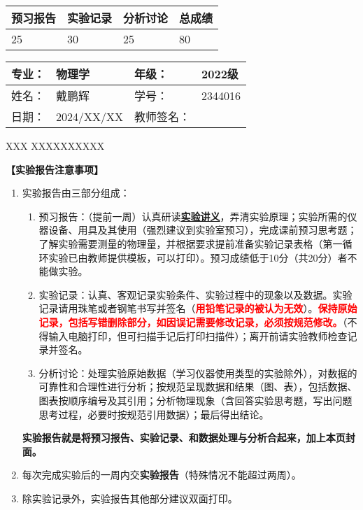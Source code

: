 \documentclass[dvipsnames, svgnames,a4paper,11pt]{article}
\begin{document}
\begin{table}
	\renewcommand\arraystretch{1.7}
	\begin{tabularx}{\textwidth}{
		|X|X|X|X
		|X|X|X|X|}
	\hline
	\multicolumn{2}{|c|}{预习报告}&\multicolumn{2}{|c|}{实验记录}&\multicolumn{2}{|c|}{分析讨论}&\multicolumn{2}{|c|}{总成绩}\\
	\hline
	\LARGE25 & & \LARGE30 & & \LARGE25 & & \LARGE80 & \\
	\hline
	\end{tabularx}
\end{table}


\begin{table}
	\renewcommand\arraystretch{1.7}
	\begin{tabularx}{\textwidth}{|X|X|X|X|}
	\hline
	专业：& 物理学 &年级：& 2022级\\
	\hline
	姓名：& 戴鹏辉  & 学号： & 2344016 \\
	\hline
	日期：& 2024/XX/XX & 教师签名：& \\
	\hline
	\end{tabularx}
\end{table}

\begin{center}
	\LARGE XXX \quad XXXXXXXXXX
\end{center}

\textbf{【实验报告注意事项】}
\begin{enumerate}
	\item 实验报告由三部分组成：
	\begin{enumerate}
		\item 预习报告：（提前一周）认真研读\underline{\textbf{实验讲义}}，弄清实验原理；实验所需的仪器设备、用具及其使用（强烈建议到实验室预习），完成课前预习思考题；了解实验需要测量的物理量，并根据要求提前准备实验记录表格（第一循环实验已由教师提供模板，可以打印）。预习成绩低于10分（共20分）者不能做实验。
	    \item 实验记录：认真、客观记录实验条件、实验过程中的现象以及数据。实验记录请用珠笔或者钢笔书写并签名（\textcolor{red}{\textbf{用铅笔记录的被认为无效}}）。\textcolor{red}{\textbf{保持原始记录，包括写错删除部分，如因误记需要修改记录，必须按规范修改。}}（不得输入电脑打印，但可扫描手记后打印扫描件）；离开前请实验教师检查记录并签名。
	    \item 分析讨论：处理实验原始数据（学习仪器使用类型的实验除外），对数据的可靠性和合理性进行分析；按规范呈现数据和结果（图、表），包括数据、图表按顺序编号及其引用；分析物理现象（含回答实验思考题，写出问题思考过程，必要时按规范引用数据）；最后得出结论。
	\end{enumerate}
	\textbf{实验报告就是将预习报告、实验记录、和数据处理与分析合起来，加上本页封面。}
	\item 每次完成实验后的一周内交\textbf{实验报告}（特殊情况不能超过两周）。
	\item 除实验记录外，实验报告其他部分建议双面打印。
\end{enumerate}
\end{document}
